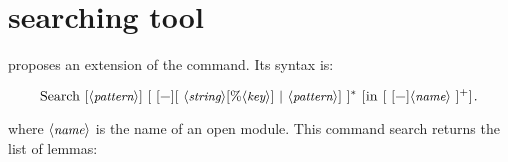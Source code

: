 \section{\ssr{} searching tool}

\ssr{} proposes an extension of the  command. Its syntax is:


$$\C{Search}\ [\N{pattern}]\ [\ [\C{\-}][\ \N{string}[\C{\%}\N{key}]\
|\ \N{pattern}]\ ]^*\
[\C{in}\ [\ [\C{\-}]\N{name}\ ]^+]\C{.}$$


where $\langle\mbox{\itshape\rmfamily\small name}\rangle$ is the name of an open module.
This command search returns the list of lemmas:
